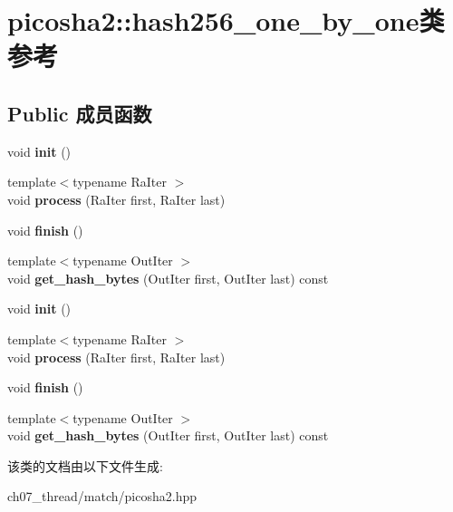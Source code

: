 \hypertarget{classpicosha2_1_1hash256__one__by__one}{}\section{picosha2\+::hash256\+\_\+one\+\_\+by\+\_\+one类 参考}
\label{classpicosha2_1_1hash256__one__by__one}
\subsection*{Public 成员函数}
\begin{DoxyCompactItemize}
\item 
\mbox{\label{classpicosha2_1_1hash256__one__by__one_a9308a2f22f9d0afbd315c9cf45458819}} 
void {\bfseries init} ()
\item 
\mbox{\label{classpicosha2_1_1hash256__one__by__one_a2ce5fc541a7c27a935eecb85b9dd6497}} 
{\footnotesize template$<$typename Ra\+Iter $>$ }\\void {\bfseries process} (Ra\+Iter first, Ra\+Iter last)
\item 
\mbox{\label{classpicosha2_1_1hash256__one__by__one_a1c2c4d24deccb590cbbd30ffeb317690}} 
void {\bfseries finish} ()
\item 
\mbox{\label{classpicosha2_1_1hash256__one__by__one_a3f9ac7afd9396f70f779cf7f99bfa4d9}} 
{\footnotesize template$<$typename Out\+Iter $>$ }\\void {\bfseries get\+\_\+hash\+\_\+bytes} (Out\+Iter first, Out\+Iter last) const
\item 
\mbox{\label{classpicosha2_1_1hash256__one__by__one_a9308a2f22f9d0afbd315c9cf45458819}} 
void {\bfseries init} ()
\item 
\mbox{\label{classpicosha2_1_1hash256__one__by__one_a2ce5fc541a7c27a935eecb85b9dd6497}} 
{\footnotesize template$<$typename Ra\+Iter $>$ }\\void {\bfseries process} (Ra\+Iter first, Ra\+Iter last)
\item 
\mbox{\label{classpicosha2_1_1hash256__one__by__one_a1c2c4d24deccb590cbbd30ffeb317690}} 
void {\bfseries finish} ()
\item 
\mbox{\label{classpicosha2_1_1hash256__one__by__one_a3f9ac7afd9396f70f779cf7f99bfa4d9}} 
{\footnotesize template$<$typename Out\+Iter $>$ }\\void {\bfseries get\+\_\+hash\+\_\+bytes} (Out\+Iter first, Out\+Iter last) const
\end{DoxyCompactItemize}


该类的文档由以下文件生成\+:\begin{DoxyCompactItemize}
\item 
ch07\+\_\+thread/match/picosha2.\+hpp\end{DoxyCompactItemize}
